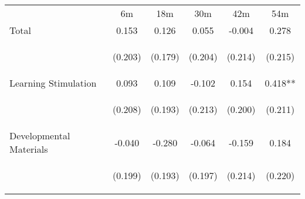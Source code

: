 \begin{tabular}{lccccc}
\hline \noalign{\smallskip} & 6m & 18m & 30m & 42m & 54m\\
\noalign{\smallskip}\hline \noalign{\smallskip}Total & 0.153 & 0.126 & 0.055 & -0.004 & 0.278\\
 & \begin{footnotesize}(0.203)\end{footnotesize} & \begin{footnotesize}(0.179)\end{footnotesize} & \begin{footnotesize}(0.204)\end{footnotesize} & \begin{footnotesize}(0.214)\end{footnotesize} & \begin{footnotesize}(0.215)\end{footnotesize}\\
\noalign{\smallskip}Learning Stimulation & 0.093 & 0.109 & -0.102 & 0.154 & 0.418**\\
 & \begin{footnotesize}(0.208)\end{footnotesize} & \begin{footnotesize}(0.193)\end{footnotesize} & \begin{footnotesize}(0.213)\end{footnotesize} & \begin{footnotesize}(0.200)\end{footnotesize} & \begin{footnotesize}(0.211)\end{footnotesize}\\
\noalign{\smallskip}Developmental Materials & -0.040 & -0.280 & -0.064 & -0.159 & 0.184\\
 & \begin{footnotesize}(0.199)\end{footnotesize} & \begin{footnotesize}(0.193)\end{footnotesize} & \begin{footnotesize}(0.197)\end{footnotesize} & \begin{footnotesize}(0.214)\end{footnotesize} & \begin{footnotesize}(0.220)\end{footnotesize}\\

\end{tabular}
